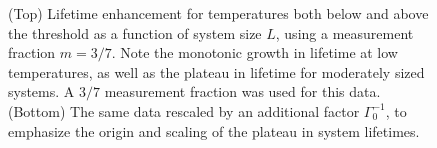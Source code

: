 \documentclass[twocolumn,superscriptaddress,aps,prb,floatfix]{revtex4-1}
\begin{document}
\begin{figure}
\begin{center}
\end{center}
\caption[justification=raggedright]{
(Top) Lifetime enhancement for temperatures both below and above the threshold as a function of system size $L$, using a measurement fraction $m=3/7$.  Note the monotonic growth in lifetime at low temperatures, as well as the plateau in lifetime for moderately sized systems. A $3/7$ measurement fraction was used for this data.
(Bottom) The same data rescaled by an additional factor $\Gamma_0^{-1}$, to emphasize the origin and scaling of the plateau in system lifetimes.}
\label{fig:LifetimeVsSystemSize}
\end{figure}
\end{document}
